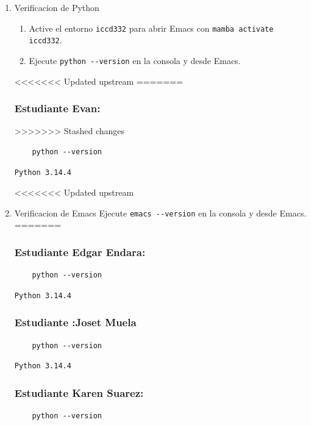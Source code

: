 \documentclass{article}
\begin{document}
\begin{enumerate}
>>>>>>> Stashed changes
\item Verificacion de Python
\begin{enumerate}
\item Active el entorno \texttt{iccd332} para abrir Emacs con \texttt{mamba activate iccd332}.
\item Ejecute \texttt{python -{}-{}version} en la consola y desde Emacs.
\end{enumerate}

<<<<<<< Updated upstream
=======

\subsubsection{Estudiante Evan:}
\label{sec:orgc36b708}
>>>>>>> Stashed changes
\begin{verbatim}
    python --version
\end{verbatim}

\begin{verbatim}
Python 3.14.4
\end{verbatim}

<<<<<<< Updated upstream
\item Verificacion de Emacs
Ejecute \texttt{emacs -{}-{}version} en la consola y desde Emacs.
=======
\subsubsection{Estudiante Edgar Endara:}
\label{sec:org8a8eeda}
\begin{verbatim}
    python --version
\end{verbatim}

\begin{verbatim}
Python 3.14.4
\end{verbatim}


\subsubsection{Estudiante :Joset Muela}
\label{sec:org2d4afcf}
\begin{verbatim}
    python --version
\end{verbatim}

\begin{verbatim}
Python 3.14.4
\end{verbatim}

\subsubsection{Estudiante Karen Suarez:}
\label{sec:org08f9ff6}
\begin{verbatim}
    python --version
\end{verbatim}


\end{enumerate}
\end{document}
